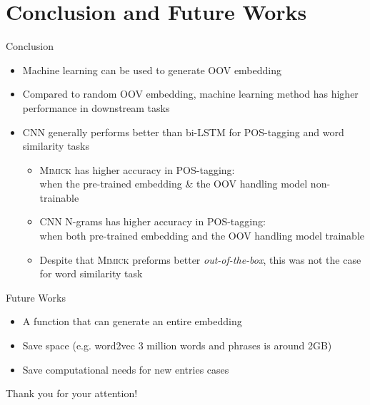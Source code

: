 \documentclass{beamer}
\begin{document}
\section{Conclusion and Future Works}
\begin{frame}{Conclusion}
    \begin{itemize}
        \item Machine learning can be
        used to generate OOV embedding
        \item Compared to random OOV embedding, machine learning
        method has higher performance in downstream tasks
        \item CNN generally performs better than bi-LSTM for POS-tagging and word
        similarity tasks
        \begin{itemize}
            \item \textsc{Mimick} has higher accuracy in
            POS-tagging:\\
            when the pre-trained embedding \& the OOV handling model non-trainable
            \item CNN N-grams has higher accuracy in POS-tagging:\\
            when both pre-trained embedding and the OOV handling model trainable
            \item Despite that \textsc{Mimick} preforms better
            \textit{out-of-the-box}, this was not the case for word
            similarity task
        \end{itemize}
    \end{itemize}
\end{frame}

\begin{frame}{Future Works}
    \begin{itemize}
        \item A function that can generate an entire embedding
        \item Save space (e.g. word2vec 3 million words and phrases is
        around 2GB)
        \item Save computational needs for new entries cases
    \end{itemize}
\end{frame}

\begin{frame}
    \Huge{\centerline{Thank you for your attention!}}
\end{frame}
    


\end{document}
